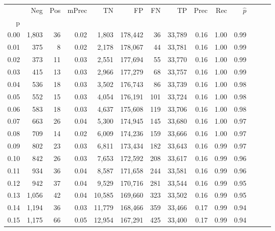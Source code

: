 \begin{tabular}{rrrrrrrrrrrrrr}
\toprule
{} &    Neg &  Pos & mPrec &       TN &       FP &      FN &      TP &  Prec &   Rec & $\hat{p}$ \\
p    &        &      &       &          &          &         &         &       &       &           \\
\midrule
0.00 &  1,803 &   36 &  0.02 &    1,803 &  178,442 &      36 &  33,789 &  0.16 &  1.00 &      0.99 \\
0.01 &    375 &    8 &  0.02 &    2,178 &  178,067 &      44 &  33,781 &  0.16 &  1.00 &      0.99 \\
0.02 &    373 &   11 &  0.03 &    2,551 &  177,694 &      55 &  33,770 &  0.16 &  1.00 &      0.99 \\
0.03 &    415 &   13 &  0.03 &    2,966 &  177,279 &      68 &  33,757 &  0.16 &  1.00 &      0.99 \\
0.04 &    536 &   18 &  0.03 &    3,502 &  176,743 &      86 &  33,739 &  0.16 &  1.00 &      0.98 \\
0.05 &    552 &   15 &  0.03 &    4,054 &  176,191 &     101 &  33,724 &  0.16 &  1.00 &      0.98 \\
0.06 &    583 &   18 &  0.03 &    4,637 &  175,608 &     119 &  33,706 &  0.16 &  1.00 &      0.98 \\
0.07 &    663 &   26 &  0.04 &    5,300 &  174,945 &     145 &  33,680 &  0.16 &  1.00 &      0.97 \\
0.08 &    709 &   14 &  0.02 &    6,009 &  174,236 &     159 &  33,666 &  0.16 &  1.00 &      0.97 \\
0.09 &    802 &   23 &  0.03 &    6,811 &  173,434 &     182 &  33,643 &  0.16 &  0.99 &      0.97 \\
0.10 &    842 &   26 &  0.03 &    7,653 &  172,592 &     208 &  33,617 &  0.16 &  0.99 &      0.96 \\
0.11 &    934 &   36 &  0.04 &    8,587 &  171,658 &     244 &  33,581 &  0.16 &  0.99 &      0.96 \\
0.12 &    942 &   37 &  0.04 &    9,529 &  170,716 &     281 &  33,544 &  0.16 &  0.99 &      0.95 \\
0.13 &  1,056 &   42 &  0.04 &   10,585 &  169,660 &     323 &  33,502 &  0.16 &  0.99 &      0.95 \\
0.14 &  1,194 &   36 &  0.03 &   11,779 &  168,466 &     359 &  33,466 &  0.17 &  0.99 &      0.94 \\
0.15 &  1,175 &   66 &  0.05 &   12,954 &  167,291 &     425 &  33,400 &  0.17 &  0.99 &      0.94 \\

\end{tabular}
